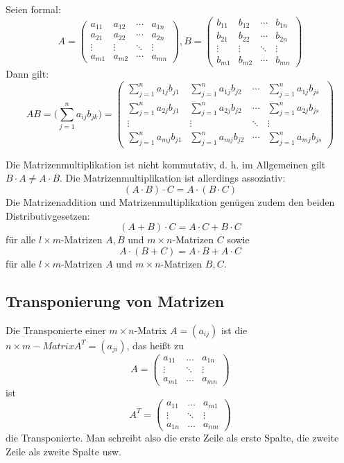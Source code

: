 \documentclass[a4paper,10pt,DIV9, BCOR12mm, oneside,openright,openbib]{scrreprt}
\theoremstyle{definition}
\theoremstyle{plain}
\begin{document}
Seien formal:
\[A =
 \begin{pmatrix}
  a_{11} & a_{12} & \cdots & a_{1n} \\
  a_{21} & a_{22} & \cdots & a_{2n} \\
  \vdots  & \vdots  & \ddots & \vdots  \\
  a_{m1} & a_{m2} & \cdots & a_{mn}
 \end{pmatrix}, 
 B =
 \begin{pmatrix}
  b_{11} & b_{12} & \cdots & b_{1n} \\
  b_{21} & b_{22} & \cdots & b_{2n} \\
  \vdots  & \vdots  & \ddots & \vdots  \\
  b_{m1} & b_{m2} & \cdots & b_{mn}
 \end{pmatrix}\]
 Dann gilt:
 \[ AB = \bigg(\sum_{j=1}^{n} a_{ij}b_{jk}\bigg) =
\begin{pmatrix}
  \sum_{j=1}^{n} a_{1j}b_{j1} & \sum_{j=1}^{n} a_{1j}b_{j2} & \cdots & \sum_{j=1}^{n} a_{1j}b_{js} \\
  \sum_{j=1}^{n} a_{2j}b_{j1} & \sum_{j=1}^{n} a_{2j}b_{j2} & \cdots & \sum_{j=1}^{n} a_{2j}b_{js} \\
  \vdots  & \vdots  & \ddots & \vdots  \\
  \sum_{j=1}^{n} a_{mj}b_{j1} & \sum_{j=1}^{n} a_{mj}b_{j2} & \cdots & \sum_{j=1}^{n} a_{mj}b_{js}
 \end{pmatrix} \]

Die Matrizenmultiplikation ist nicht kommutativ, d. h. im Allgemeinen gilt $B \cdot A \neq A \cdot B$. Die Matrizenmultiplikation ist allerdings assoziativ:
   \[ (A \cdot B) \cdot C = A \cdot (B \cdot C)\]
Die Matrizenaddition und Matrizenmultiplikation genügen zudem den beiden Distributivgesetzen:
   \[ (A + B) \cdot C = A \cdot C + B \cdot C\]
für alle $l \times m$-Matrizen $A,B$ und $m \times n$-Matrizen $C$ sowie
   \[ A \cdot (B + C) = A \cdot B + A \cdot C\]
für alle $l \times m$-Matrizen $A$ und $m \times n$-Matrizen $B, C$.

\subsection{Transponierung von Matrizen}
Die Transponierte einer $m\times n$-Matrix $A = \left(a_{ij}\right)$ ist die $n\times m-Matrix A^T = \left(a_{ji}\right)$, das heißt zu
   \[ A= \begin{pmatrix} a_{11} & \dots &a_{1n} \\ \vdots &\ddots &\vdots \\ a_{m1} & \dots &a_{mn} \end{pmatrix}\] 
ist
    \[A^T = \begin{pmatrix} a_{11} & \dots &a_{m1} \\ \vdots &\ddots &\vdots \\ a_{1n} & \dots &a_{mn} \end{pmatrix} \]
die Transponierte. Man schreibt also die erste Zeile als erste Spalte, die zweite Zeile als zweite Spalte usw.
\end{document}
